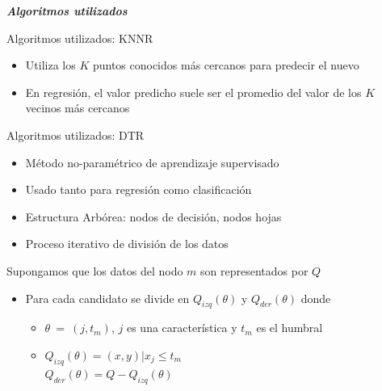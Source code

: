 \documentclass[10pt]{beamer}
\newcommand\IncrFont{\fontsize{20}{20}\selectfont}
\begin{document}
\begin{frame}{}
  \IncrFont
  \begin{center}
    \textit{\textbf{Algoritmos utilizados}}
  \end{center}
\end{frame}



\begin{frame}{Algoritmos utilizados: KNNR}
  \begin{itemize}
    \item Utiliza los $K$ puntos conocidos más cercanos para predecir el nuevo
    \item En regresión, el valor predicho suele ser el promedio del valor de los $K$ vecinos más cercanos
  \end{itemize}
\end{frame}


\begin{frame}{Algoritmos utilizados: DTR}
  \begin{itemize}
    \item Método no-paramétrico de aprendizaje supervisado
    \item Usado tanto para regresión como clasificación
    \item Estructura Arbórea: nodos de decisión, nodos hojas
    \item Proceso iterativo de división de los datos
  \end{itemize}
  \pause
  Supongamos que los datos del nodo $m$ son representados por $Q$
  \begin{itemize}
    \item Para cada candidato se divide en $Q_{izq}(\theta)$ y $Q_{der}(\theta)$
    donde
      \begin{itemize}
        \item $\theta\ =\ (j, t_{m})$,
          $j$ es una característica y $t_{m}$ es el humbral
        \item $Q_{izq}(\theta) = (x, y) | x_{j} \leq t_m$ \\
        $Q_{der}(\theta) = Q - Q_{izq}(\theta)$
      \end{itemize}
  \end{itemize}

\end{frame}
\end{document}
